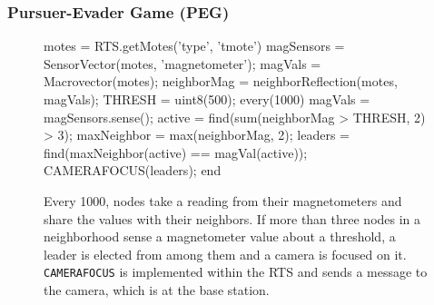 \subsubsection{Pursuer-Evader Game (PEG)}\label{sect:peg}

\begin{figure}[ht]  
  \begin{macrolab}
motes = RTS.getMotes('type', 'tmote')
magSensors = SensorVector(motes, 'magnetometer');
magVals = Macrovector(motes);
neighborMag = neighborReflection(motes, magVals);
THRESH = uint8(500);
every(1000)
  magVals =  magSensors.sense();
  active = find(sum(neighborMag > THRESH, 2) > 3);
  maxNeighbor = max(neighborMag, 2);
  leaders = find(maxNeighbor(active) == magVal(active));
  CAMERAFOCUS(leaders);
end
  \end{macrolab}
  \caption[A tracking application (PEG) in MacroLab]{Every 1000\ms, nodes take a
  reading from their magnetometers and share the values with their neighbors.
  If more than three nodes in a neighborhood sense a magnetometer value about a
  threshold, a leader is elected from among them and a camera is focused on
  it. {\tt CAMERAFOCUS} is implemented within the RTS and sends a message to the
  camera, which is at the base station.}
  \label{code:PEG}
\end{figure}

